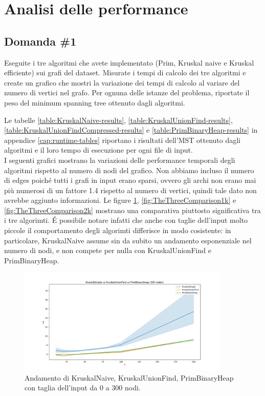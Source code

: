 \section{Analisi delle performance}
\label{cap:performance-analysis}

\subsection{Domanda \#1}

\begin{displayquote}
Eseguite i tre algoritmi che avete implementato (Prim, Kruskal naive e Kruskal efficiente) sui grafi del dataset. Misurate i tempi di calcolo dei tre algoritmi e create un grafico che mostri la variazione dei tempi di calcolo al variare del numero di vertici nel grafo. Per ognuna delle istanze del problema, riportate il peso del minimum spanning tree ottenuto dagli algoritmi.
\end{displayquote}

\noindent Le tabelle \ref{table:KruskalNaive-results},
 \ref{table:KruskalUnionFind-results}, \ref{table:KruskalUnionFindCompressed-results}
 e \ref{table:PrimBinaryHeap-results} in appendice \ref{cap:runtime-tables} riportano i risultati dell'MST ottenuto dagli algoritmi e il loro tempo di esecuzione per ogni file di input. \\

\noindent I seguenti grafici mostrano la variazioni delle performance temporali degli algoritmi rispetto al numero di nodi del grafico. Non abbiamo incluso il numero di edges poiché tutti i grafi in input erano sparsi, ovvero gli archi non erano mai più numerosi di un fattore 1.4 rispetto al numero di vertici, quindi tale dato non avrebbe aggiunto informazioni. Le figure \ref{fig:TheThreeComparison300}, \ref{fig:TheThreeComparison1k}
e \ref{fig:TheThreeComparison2k} mostrano una comparativa piuttosto significativa tra i tre algorimti.
\'E possibile notare infatti che anche con taglie dell'input molto piccole il comportamento degli
algorimti differisce in modo cosistente: in particolare, KruskalNaive assume sin da subito un
andamento esponenziale nel numero di nodi, e non compete per nulla con KruskalUnionFind e PrimBinaryHeap.

\begin{figure}[H]
    \centering
    \includegraphics[width=0.9\textwidth]{./images/KruskalNaive_vs_KruskalUnionFind_vs_PrimBinaryHeap_(300_nodes).png}
	\caption{Andamento di KruskalNaive, KruskalUnionFind, PrimBinaryHeap con taglia dell'input da 0 a 300 nodi.}
    \label{fig:TheThreeComparison300}
\end{figure}

